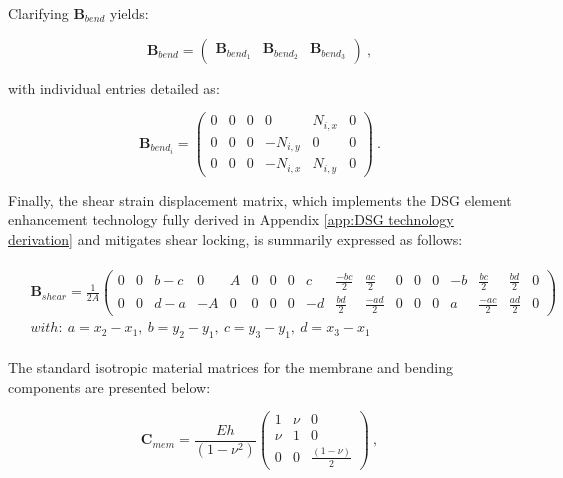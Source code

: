 Clarifying $\mathbf{B}_{bend}$ yields:

\begin{equation} 
\mathbf{B}_{bend} =  \begin{pmatrix}
\mathbf{B}_{bend_1} & \mathbf{B}_{bend_2} & \mathbf{B}_{bend_3}
\end{pmatrix} 
\label{eqt8}\ ,
\end{equation}

with individual entries detailed as:

\begin{equation} 
\mathbf{B}_{bend_i} =  \begin{pmatrix}
0 & 0 & 0 & 0 & N_{i,x} & 0 \\
0 & 0 & 0 & -N_{i,y} & 0 & 0 \\
0 & 0 & 0 & -N_{i,x} & N_{i,y} & 0
\end{pmatrix} 
\label{eqt9}\ .
\end{equation}

Finally, the shear strain displacement matrix, which implements the DSG element enhancement technology fully derived in Appendix \ref{app:DSG technology derivation} and mitigates shear locking, is summarily expressed as follows:

\begin{gather} 
	\begin{aligned}
		& \mathbf{B}_{shear} =  \frac{1}{2 A}
		\begin{pmatrix}
			0 & 0 & b-c & 0 & A & 0 & 0 & 0 & c & \frac{-bc}{2} & \frac{ac}{2} & 0 & 0 & 0 & -b & \frac{bc}{2} & \frac{bd}{2} & 0 \\
			0 & 0 & d-a & -A & 0 & 0 & 0 & 0 & -d & \frac{bd}{2} & \frac{-ad}{2} & 0 & 0 & 0 & a & \frac{-ac}{2} & \frac{ad}{2} & 0
		\end{pmatrix}
		\\
		& with:\ 
		a = x_2-x_1,\ 
		b = y_2-y_1,\ 
		c = y_3-y_1,\ 
		d = x_3 - x_1
		\label{eqt10}
	\end{aligned}
\end{gather}

The standard isotropic material matrices for the membrane and bending components are presented below:

\begin{equation} 
\mathbf{C}_{mem} =  \frac{Eh}{(1-\nu^2)}
\begin{pmatrix}
1 & \nu & 0 \\
\nu & 1 & 0 \\
0 & 0 & \frac{(1-\nu)}{2}
\end{pmatrix}
\label{eqt11}\ ,
\end{equation}

